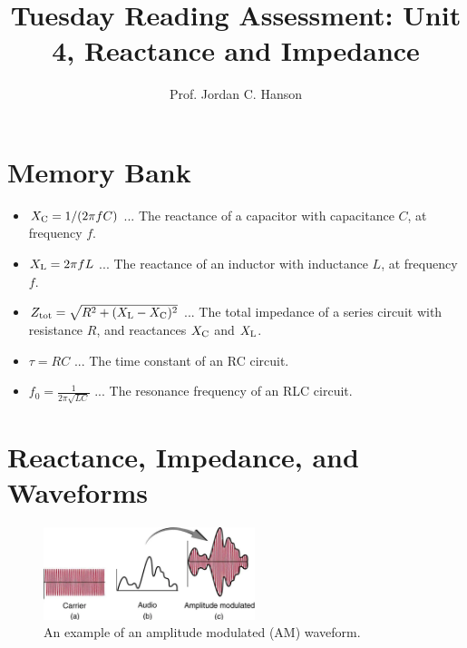 \documentclass{article}
\begin{document}
\title{Tuesday Reading Assessment: Unit 4, Reactance and Impedance}
\author{Prof. Jordan C. Hanson}

\maketitle

\section{Memory Bank}

\begin{itemize}
\item $X_{\rm C} = 1/(2\pi f C)$ ... The reactance of a capacitor with capacitance $C$, at frequency $f$.
\item $X_{\rm L} = 2\pi f L$ ... The reactance of an inductor with inductance $L$, at frequency $f$.
\item $Z_{\rm tot} = \sqrt{R^2 + (X_{\rm L} - X_{\rm C})^2}$ ... The total impedance of a series circuit with resistance $R$, and reactances $X_{\rm C}$ and $X_{\rm L}$.
\item $\tau = RC$ ... The time constant of an RC circuit.
\item $f_0 = \frac{1}{2\pi\sqrt{LC}}$ ... The resonance frequency of an RLC circuit.
\end{itemize}

\section{Reactance, Impedance, and Waveforms}

\begin{figure}
\centering
\includegraphics[width=0.55\textwidth]{figures/AM.png}
\caption{\label{fig:1} An example of an amplitude modulated (AM) waveform.}
\end{figure}
\end{document}

